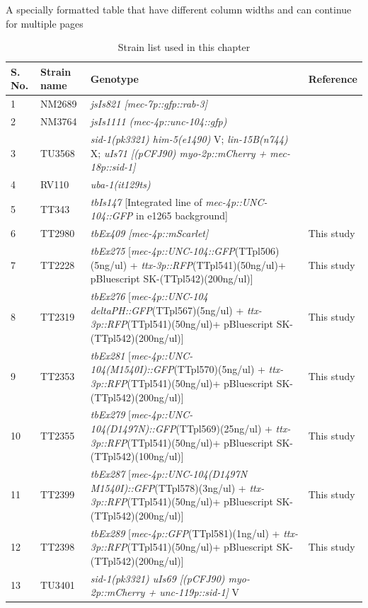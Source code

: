 A specially formatted table that have different column widths and can continue for multiple pages
\begin{table}[H]\centering
	\caption{Strain list used in this chapter}\label{tab:Strainlist2}
	\scriptsize
	\begin{tabularx}{1\textwidth}{@{} l l L l @{}}\toprule
		S. No. &Strain name &Genotype &Reference \\ &NM2689 &\textit{jsIs821 [mec-7p::gfp::rab-3]} &\cite{bounoutas2009} \\
		2 &NM3764 &\textit{jsIs1111 (mec-4p::unc-104::gfp)} &\cite{kumar2010} \\
		3 &TU3568 &\textit{sid-1(pk3321) him-5(e1490)} V; \textit{lin-15B(n744)} X; \textit{uIs71 [(pCFJ90) myo-2p::mCherry + mec-18p::sid-1]} &\cite{calixto2010} \\
		4 &RV110 &\textit{uba-1(it129ts)} &\cite{kulkarni2008} \\
		5 &TT343 &\textit{tbIs147} [Integrated line of \textit{mec-4p::UNC-104::GFP} in e1265 background] &\cite{kumar2010} \\
		6 &TT2980 &\textit{tbEx409 [mec-4p::mScarlet]} &This study \\
		7 &TT2228 &\textit{tbEx275} [\textit{mec-4p::UNC-104::GFP}(TTpl506)(5ng/ul) + \textit{ttx-3p::RFP}(TTpl541)(50ng/ul)+ pBluescript SK-(TTpl542)(200ng/ul)] &This study \\
		8 &TT2319 &\textit{tbEx276} [\textit{mec-4p::UNC-104 deltaPH::GFP}(TTpl567)(5ng/ul) + \textit{ttx-3p::RFP}(TTpl541)(50ng/ul)+ pBluescript SK-(TTpl542)(200ng/ul)] &This study \\
		9 &TT2353 &\textit{tbEx281} [\textit{mec-4p::UNC-104(M1540I)::GFP}(TTpl570)(5ng/ul) + \textit{ttx-3p::RFP}(TTpl541)(50ng/ul)+ pBluescript SK-(TTpl542)(200ng/ul)] &This study \\
		10 &TT2355 &\textit{tbEx279} [\textit{mec-4p::UNC-104(D1497N)::GFP}(TTpl569)(25ng/ul) + \textit{ttx-3p::RFP}(TTpl541)(50ng/ul)+ pBluescript SK-(TTpl542)(100ng/ul)] &This study \\
		11 &TT2399 &\textit{tbEx287} [\textit{mec-4p::UNC-104(D1497N M1540I)::GFP}(TTpl578)(3ng/ul) + \textit{ttx-3p::RFP}(TTpl541)(50ng/ul)+ pBluescript SK-(TTpl542)(200ng/ul)] &This study \\
		12 &TT2398 &\textit{tbEx289} [\textit{mec-4p::GFP}(TTpl581)(1ng/ul) + \textit{ttx-3p::RFP}(TTpl541)(50ng/ul)+ pBluescript SK-(TTpl542)(200ng/ul)] &This study \\
		13 &TU3401 &\textit{sid-1(pk3321) uIs69 [(pCFJ90) myo-2p::mCherry + unc-119p::sid-1]} V &\cite{calixto2010} \\
		\bottomrule
	\end{tabularx}
\end{table}


%